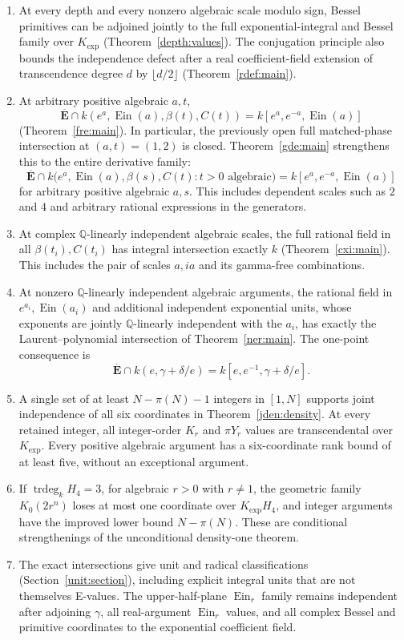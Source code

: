 \documentclass[11pt]{article}
\theoremstyle{definition}
\theoremstyle{remark}
\newcommand{\Ebar}{\overline{\mathbf E}}
\newcommand{\trdeg}{\operatorname{trdeg}}
\newcommand{\Ein}{\operatorname{Ein}}
\newcommand{\Kexp}{K_{\mathrm{exp}}}
\begin{document}
\begin{enumerate}
\item At every depth and every nonzero algebraic scale modulo sign,
Bessel primitives can be adjoined jointly to the full exponential-integral
and Bessel family over $\Kexp$ (Theorem~\ref{depth:values}).
The conjugation principle also bounds the independence defect after a
real coefficient-field extension of transcendence degree $d$ by
$\lfloor d/2\rfloor$ (Theorem~\ref{rdef:main}).
\item At arbitrary positive algebraic $a,t$,
\[
 \Ebar\cap k(e^a,\Ein(a),\beta(t),C(t))
   =k[e^a,e^{-a},\Ein(a)]
\]
(Theorem~\ref{fre:main}). In particular, the previously open full
matched-phase intersection at $(a,t)=(1,2)$ is closed.
Theorem~\ref{gde:main} strengthens this to the entire derivative family:
\[
 \Ebar\cap k\bigl(e^a,\Ein(a),\beta(s),C(t):
                    t>0\text{ algebraic}\bigr)
 =k[e^a,e^{-a},\Ein(a)]
\]
for arbitrary positive algebraic $a,s$. This includes dependent scales
such as $2$ and $4$ and arbitrary rational expressions in the generators.
\item At complex $\mathbb Q$-linearly independent algebraic scales,
the full rational field in all $\beta(t_i),C(t_i)$ has integral
intersection exactly $k$ (Theorem~\ref{cxi:main}). This includes
the pair of scales $a,ia$ and its gamma-free combinations.
\item At nonzero $\mathbb Q$-linearly independent algebraic arguments,
the rational field in $e^{a_i},\Ein(a_i)$ and additional independent
exponential units, whose exponents are jointly $\mathbb Q$-linearly
independent with the $a_i$, has exactly the Laurent--polynomial intersection
of Theorem~\ref{ner:main}. The one-point consequence is
\[
 \Ebar\cap k(e,\gamma+\delta/e)
       =k[e,e^{-1},\gamma+\delta/e].
\]
\item A single set of at least $N-\pi(N)-1$ integers in $[1,N]$
supports joint independence of all six coordinates in
Theorem~\ref{jden:density}. At every retained integer, all integer-order
$K_r$ and $\pi Y_r$ values are transcendental over $\Kexp$.
Every positive algebraic argument has a six-coordinate rank bound of
at least five, without an exceptional argument.
\item If $\trdeg_kH_4=3$, for algebraic $r>0$ with $r\ne1$, the geometric family $K_0(2r^n)$ loses
at most one coordinate over $\Kexp H_4$, and integer arguments have
the improved lower bound $N-\pi(N)$. These are conditional strengthenings
of the unconditional density-one theorem.
\item The exact intersections give unit and radical classifications
(Section~\ref{unit:section}), including explicit integral units that
are not themselves E-values. The upper-half-plane $\Ein_r$ family remains independent after
adjoining $\gamma$, all real-argument $\Ein_r$ values, and all complex
Bessel and primitive coordinates to the exponential coefficient field.
\end{enumerate}
\end{document}
